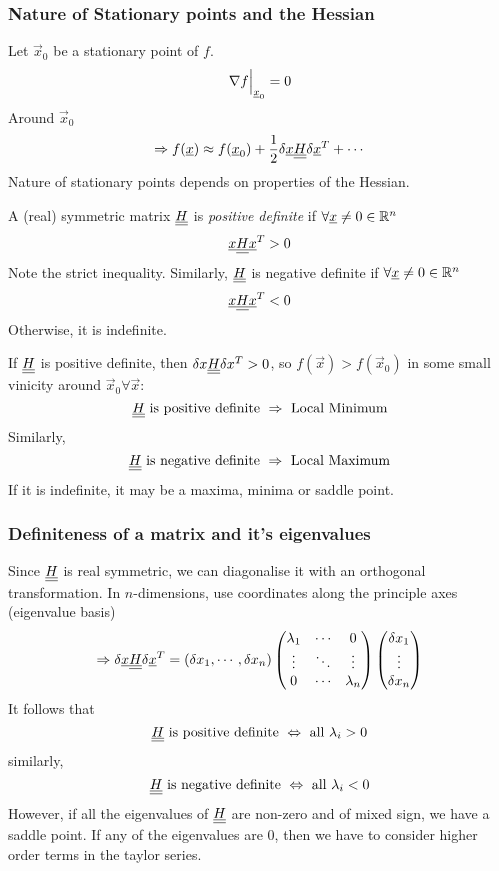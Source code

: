 \documentclass{article}
\begin{document}
\subsubsection{Nature of Stationary points and the Hessian}
Let $\vec x_0$ be a stationary point of $f$.
\[
    \nabla f \Big{|}_{\underline{x}_0}{} = 0  
\]
Around $\vec x_0$
\[
    \Rightarrow f(\underline{x}) \approx f(\underline{x}_0) + \frac{1}{2} \delta \underline{x} \underline{\underline{H}} \delta \underline{x}^T + \cdots 
\]
Nature of stationary points depends on properties of the Hessian.

\begin{defi}
    A (real) symmetric matrix $\underline{\underline{H}}$ is \emph{positive definite} if $\forall \underline{x} \neq 0 \in \mathbb{R}^n$
    \[
        \underline{x} \underline{\underline{H}} \underline{x}^T >0    
    \]
    Note the strict inequality. 
    Similarly, $\underline{\underline{H}}$ is negative definite if $\forall \underline{x} \neq 0 \in \mathbb{R}^n$
    \[
        \underline{x} \underline{\underline{H}} \underline{x}^T <0    
    \]
    Otherwise, it is indefinite.
\end{defi}
If $\underline{\underline{H}}$ is positive definite, then $\delta x \underline{\underline{H}} \delta x^T > 0$, so $f(\vec x) > f(\vec x_0)$ in some small vinicity around $\vec x_0 \forall \vec x$:\
\[
    \underline{\underline{H}} \text{ is positive definite } \Rightarrow \text{ Local Minimum}  
\]
Similarly,
\[
    \underline{\underline{H}} \text{ is negative definite } \Rightarrow \text{ Local Maximum}  
\]
If it is indefinite, it may be a maxima, minima or saddle point.

\subsubsection*{Definiteness of a matrix and it's eigenvalues}
Since $\underline{\underline{H}}$ is real symmetric, we can diagonalise it with an orthogonal transformation.
In $n$-dimensions, use coordinates along the principle axes (eigenvalue basis)
\[
    \Rightarrow \delta \underline{x} \underline{\underline{H}}\delta  \underline{x}^T = (\delta x_1, \cdots, \delta x_n) \begin{pmatrix}
        \lambda_1 & \cdots & 0 \\
        \vdots & \ddots & \vdots \\
        0 & \cdots & \lambda_n
    \end{pmatrix}\begin{pmatrix}
        \delta x_1 \\ \vdots \\ \delta x_n
    \end{pmatrix}
\]
It follows that
\[
    \underline{\underline{H}} \text{ is positive definite } \Leftrightarrow \text{ all } \lambda_i > 0 
\]
similarly,
\[
    \underline{\underline{H}} \text{ is negative definite } \Leftrightarrow \text{ all } \lambda_i < 0 
\]
However, if all the eigenvalues of $\underline{\underline{H}}$ are non-zero and of mixed sign, we have a saddle point.
If any of the eigenvalues are $0$, then we have to consider higher order terms in the taylor series.
\end{document}
